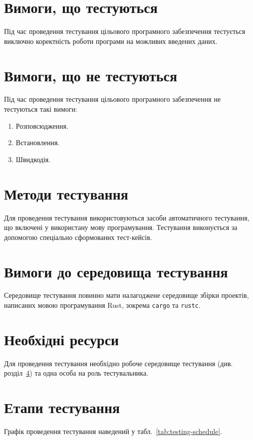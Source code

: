 \documentclass[a4paper,oneside,DIV=12,12pt]{scrartcl}
\newcommand{\program}[1]{\texttt{#1}}
\begin{document}
	\section{Вимоги, що тестуються}
		Під час проведення тестування цільового програмного забезпечення тестується виключно коректність роботи програми на можливих введених даних.
		
	\section{Вимоги, що не тестуються}
		Під час проведення тестування цільового програмного забезпечення не тестуються такі вимоги:
		\begin{enumerate}
			\item Розповсюдження.
			\item Встановлення.
			\item Швидкодія.
		\end{enumerate}
		
	\section{Методи тестування}
		Для проведення тестування використовуються засоби автоматичного тестування, що включені у використану мову програмування.
		Тестування виконується за допомогою спеціально сформованих тест-кейсів.
		
	\section{Вимоги до середовища тестування}
		\label{sec:testing-environment}
		
		Середовище тестування повинно мати налагоджене середовище збірки проектів, написаних мовою програмування Rust, зокрема \program{cargo} та \program{rustc}.
		
		
	\section{Необхідні ресурси}
		Для проведення тестування необхідно робоче середовище тестування (див. розділ~\ref{sec:testing-environment}) та одна особа на роль тестувальника.
		
	\section{Етапи тестування}
		Графік проведення тестування наведений у табл.~\ref{tab:testing-schedule}.
		
\end{document}
